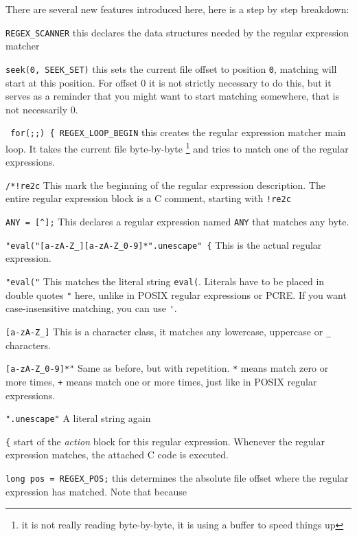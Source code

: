 There are several new features introduced here, here is a step by step breakdown:
\begin{description}
 \item \verb+REGEX_SCANNER+ this declares the data structures needed by the regular expression matcher
 \item \verb+seek(0, SEEK_SET)+ this sets the current file offset to position \verb+0+, matching will start at this position.
For offset 0 it is not strictly necessary to do this, but it serves as a reminder that you might want to start matching somewhere, that is not necessarily 0.
 \item \verb+ for(;;) { REGEX_LOOP_BEGIN+ this creates the regular expression matcher main loop. It takes the current file byte-by-byte \footnote{it is not really
reading byte-by-byte, it is using a buffer to speed things up} and tries to match one of the regular expressions.
 \item \verb+/*!re2c+ This mark the beginning of the regular expression description. The entire regular expression block is a C comment, starting with \verb+!re2c+
 \item \verb+ANY = [^];+ This declares a regular expression named \verb+ANY+ that matches any byte.
 \item \verb+"eval("[a-zA-Z_][a-zA-Z_0-9]*".unescape" {+ This is the actual regular expression.
\begin{description}
 \item \verb+"eval("+ This matches the literal string \verb+eval(+.
Literals have to be placed in double quotes \verb+"+ here, unlike in POSIX regular expressions or PCRE.
If you want case-insensitive matching, you can use \verb+'+.
 \item \verb+[a-zA-Z_]+ This is a character class, it matches any lowercase, uppercase or \verb+_+ characters.
 \item \verb+[a-zA-Z_0-9]*"+ Same as before, but with repetition. \verb+*+ means match zero or more times, \verb|+| means match one or more times, just like in POSIX
regular expressions.
 \item \verb+".unescape"+ A literal string again
 \item \verb+{+ start of the \emph{action} block for this regular expression. Whenever the regular expression matches, the attached C code is executed.
\end{description}
 \item \verb+long pos = REGEX_POS;+ this determines the absolute file offset where the regular expression has matched. Note that because

\end{description}
